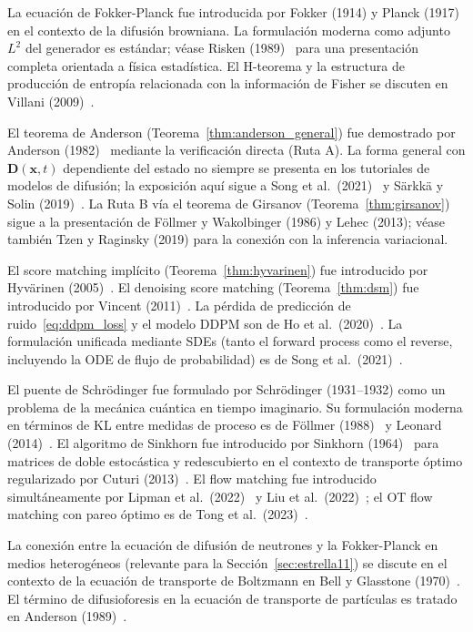 \begin{notasbib}
La ecuación de Fokker-Planck fue introducida por Fokker (1914) y Planck (1917)
en el contexto de la difusión browniana. La formulación moderna como adjunto
$L^2$ del generador es estándar; véase Risken (1989)~\cite{risken1989fokker}
para una presentación completa orientada a física estadística. El H-teorema y la
estructura de producción de entropía relacionada con la información de Fisher
se discuten en Villani (2009)~\cite{villani2009optimal}.

El teorema de Anderson (Teorema~\ref{thm:anderson_general}) fue demostrado por
Anderson (1982)~\cite{anderson1982reverse} mediante la verificación directa
(Ruta A). La forma general con $\bm{D}(\bm{x},t)$ dependiente del estado no
siempre se presenta en los tutoriales de modelos de difusión; la exposición aquí
sigue a Song et al.\ (2021)~\cite{song2021score} y Särkkä y Solin
(2019)~\cite{sarkka2019applied}. La Ruta B vía el teorema de Girsanov
(Teorema~\ref{thm:girsanov}) sigue a la presentación de Föllmer y Wakolbinger
(1986) y Lehec (2013); véase también Tzen y Raginsky (2019) para la conexión
con la inferencia variacional.

El score matching implícito (Teorema~\ref{thm:hyvarinen}) fue introducido por
Hyvärinen (2005)~\cite{hyvarinen2005estimation}. El denoising score matching
(Teorema~\ref{thm:dsm}) fue introducido por Vincent (2011)~\cite{vincent2011connection}.
La pérdida de predicción de ruido~\eqref{eq:ddpm_loss} y el modelo DDPM son de
Ho et al.\ (2020)~\cite{ho2020denoising}. La formulación unificada mediante SDEs
(tanto el forward process como el reverse, incluyendo la ODE de flujo de
probabilidad) es de Song et al.\ (2021)~\cite{song2021score}.

El puente de Schrödinger fue formulado por Schrödinger (1931--1932) como un
problema de la mecánica cuántica en tiempo imaginario. Su formulación moderna en
términos de KL entre medidas de proceso es de Föllmer (1988)~\cite{follmer1988random}
y Leonard (2014)~\cite{leonard2014survey}. El algoritmo de Sinkhorn fue
introducido por Sinkhorn (1964)~\cite{sinkhorn1964relationship} para matrices
de doble estocástica y redescubierto en el contexto de transporte óptimo
regularizado por Cuturi (2013)~\cite{cuturi2013sinkhorn}. El flow matching fue
introducido simultáneamente por Lipman et al.\ (2022)~\cite{lipman2022flow} y
Liu et al.\ (2022)~\cite{liu2022flow}; el OT flow matching con pareo óptimo es
de Tong et al.\ (2023)~\cite{tong2023improving}.

La conexión entre la ecuación de difusión de neutrones y la Fokker-Planck en
medios heterogéneos (relevante para la Sección~\ref{sec:estrella11}) se discute
en el contexto de la ecuación de transporte de Boltzmann en Bell y Glasstone
(1970)~\cite{bell1970nuclear}. El término de difusioforesis en la ecuación de
transporte de partículas es tratado en Anderson (1989)~\cite{anderson1989colloid}.
\end{notasbib}

